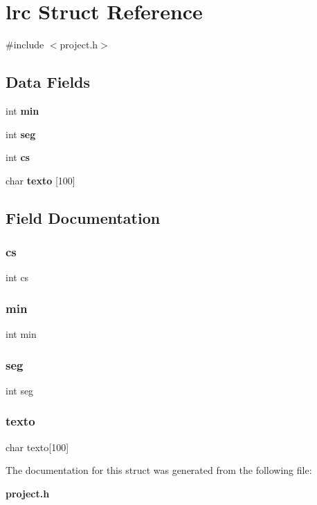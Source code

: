 \section{lrc Struct Reference}
\label{structlrc}


{\ttfamily \#include $<$project.\+h$>$}

\subsection*{Data Fields}
\begin{DoxyCompactItemize}
\item 
int \textbf{ min}
\item 
int \textbf{ seg}
\item 
int \textbf{ cs}
\item 
char \textbf{ texto} [100]
\end{DoxyCompactItemize}


\subsection{Field Documentation}
\mbox{\label{structlrc_ad35c7ed2784f4fb57849237ce534f17e}} 
\subsubsection{cs}
{\footnotesize\ttfamily int cs}

\mbox{\label{structlrc_a3e202b201e6255d975cd6d3aff1f5a4d}} 
\subsubsection{min}
{\footnotesize\ttfamily int min}

\mbox{\label{structlrc_a1d5f6f91d20f3974c9d03f6bb56afc27}} 
\subsubsection{seg}
{\footnotesize\ttfamily int seg}

\mbox{\label{structlrc_a0483fa55a1e6e8682a762fdb280d18d2}} 
\subsubsection{texto}
{\footnotesize\ttfamily char texto[100]}



The documentation for this struct was generated from the following file\+:\begin{DoxyCompactItemize}
\item 
\textbf{ project.\+h}\end{DoxyCompactItemize}
